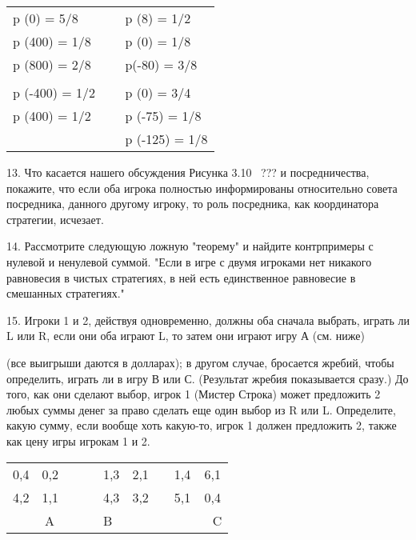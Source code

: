\documentclass[a4paper,12pt]{article}
\begin{document}
\begin{tabular}{ll}
\hline
\multicolumn{1}{|l}{p (0) = 5/8} & \multicolumn{1}{|l|}{p (8) = 1/2} \\
\multicolumn{1}{|l}{p (400) = 1/8} & \multicolumn{1}{|l|}{p (0) = 1/8} \\
\multicolumn{1}{|l}{p (800) = 2/8} & \multicolumn{1}{|l|}{p(-80) = 3/8} \\
\hline &  \\ \hline \multicolumn{1}{|l}{p (-400) =
1/2 \ \ } & \multicolumn{1}{|l|}{p (0) = 3/4}
\\
\multicolumn{1}{|l}{p (400) = 1/2} & \multicolumn{1}{|l|}{p (-75) = 1/8} \\
\multicolumn{1}{|l}{} & \multicolumn{1}{|l|}{p
(-125) = 1/8} \\ \hline
\end{tabular}

13. Что касается нашего обсуждения Рисунка 3.10 \
??? и посредничества, покажите, что если оба игрока
полностью информированы относительно совета
посредника, данного другому игроку, то роль
посредника, как координатора стратегии, исчезает.

14. Рассмотрите следующую ложную "теорему" и
найдите контрпримеры с нулевой и ненулевой суммой.
"Если в игре с двумя игроками нет никакого
равновесия в чистых стратегиях, в ней есть
единственное равновесие в смешанных стратегиях."

15. Игроки 1 и 2, действуя одновременно, должны оба
сначала выбрать, играть ли L или R, если они оба
играют L, то затем они играют игру А (см. ниже)

(все выигрыши даются в долларах); в другом случае,
бросается жребий, чтобы определить, играть ли в
игру В или С. (Результат жребия показывается
сразу.) До того, как они сделают выбор, игрок 1
(Мистер Строка) может предложить 2 любых суммы
денег за право сделать еще один выбор из R или L.
Определите, какую сумму, если вообще хоть какую-то,
игрок 1 должен предложить 2, также как цену игры
игрокам 1 и 2.

\begin{tabular}{|l|ll|l|ll|l|l|}
\cline{1-2}\cline{4-5}\cline{7-8} 0,4 & 0,2 &
\multicolumn{1}{|l|}{} & 1,3 & 2,1 &
\multicolumn{1}{|l|}{} & 1,4 & 6,1 \\
\cline{1-2}\cline{4-5}\cline{7-8} 4,2 & 1,1 &
\multicolumn{1}{|l|}{} & 4,3 & 3,2 &
\multicolumn{1}{|l|}{} & 5,1 & 0,4 \\
\cline{1-2}\cline{4-5}\cline{7-8}
\multicolumn{2}{l}{\ \ \ \ \ A} & \ \ \  &
\multicolumn{2}{l}{B} &  & \multicolumn{2}{l}{\ \ \
\ \ \ C}\end{tabular}
\end{document}

